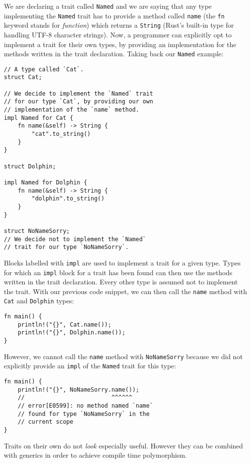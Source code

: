 \documentclass[twocolumn]{article}
\newcommand{\rust}[1]{\texttt{#1}}
\begin{document}
We are declaring a trait called \rust{Named} and we are saying that any type implementing the \rust{Named} trait has to provide a method called \rust{name} (the \rust{fn} keyword stands for \textit{function}) which returns a \rust{String} (Rust's built-in type for handling UTF-8 character strings).
Now, a programmer can explicitly opt to implement a trait for their own types, by providing an implementation for the methods written in the trait declaration. Taking back our \rust{Named} example:
\begin{verbatim}
// A type called `Cat`.
struct Cat;

// We decide to implement the `Named` trait
// for our type `Cat`, by providing our own
// implementation of the `name` method.
impl Named for Cat {
    fn name(&self) -> String {
        "cat".to_string()
    }
}

struct Dolphin;

impl Named for Dolphin {
    fn name(&self) -> String {
        "dolphin".to_string()
    }
}

struct NoNameSorry;
// We decide not to implement the `Named`
// trait for our type `NoNameSorry`.
\end{verbatim}
Blocks labelled with \rust{impl} are used to implement a trait for a given type. Types for which an \rust{impl} block for a trait has been found can then use the methods written in the trait declaration. Every other type is assumed not to implement the trait. With our previous code snippet, we can then call the \rust{name} method with \rust{Cat} and \rust{Dolphin} types:
\begin{verbatim}
fn main() {
    println!("{}", Cat.name());
    println!("{}", Dolphin.name());
}
\end{verbatim}
However, we cannot call the \rust{name} method with \rust{NoNameSorry} because we did not explicitly provide an \rust{impl} of the \rust{Named} trait for this type:
\begin{verbatim}
fn main() {
    println!("{}", NoNameSorry.name());
    //                         ^^^^^^
    // error[E0599]: no method named `name`
    // found for type `NoNameSorry` in the
    // current scope
}
\end{verbatim}

Traits on their own do not \textit{look} especially useful. However they can be combined with generics in order to achieve compile time polymorphism.
\end{document}
